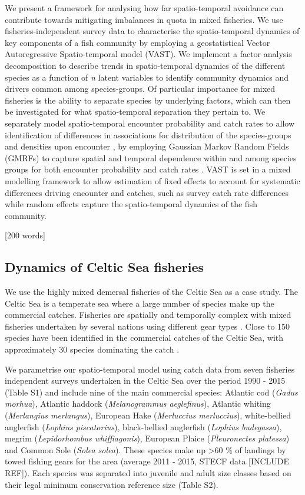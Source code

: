 \documentclass{nature}
\begin{document}
\begin{linenumbers}
We present a framework for analysing how far spatio-temporal avoidance can
contribute towards mitigating imbalances in quota in mixed fisheries. We use
fisheries-independent survey data to characterise the spatio-temporal dynamics
of key components of a fish community by employing a geostatistical Vector
Autoregressive Spatio-temporal model (VAST). We implement a factor analysis
decomposition to describe trends in spatio-temporal dynamics of the different
species as a function of \textit{n} latent variables \cite{Thorson2015} to
identify community dynamics and drivers common among species-groups. Of
particular importance for mixed fisheries is the ability to separate species by
underlying factors, which can then be investigated for what spatio-temporal
separation they pertain to. We separately model spatio-temporal encounter
probability and catch rates to allow identification of differences in
associations for distribution of the species-groups and densities upon
encounter \cite{Thorson2015a}, by employing Gaussian Markov Random Fields
(GMRFs) to capture spatial and temporal dependence within and among species
groups for both encounter probability and catch rates \cite{Thorson2013}. VAST
is set in a mixed modelling framework to allow estimation of fixed effects to
account for systematic differences driving encounter and catches, such as
survey catch rate differences while random effects capture the spatio-temporal
dynamics of the fish community.

[200 words]

\subsection{Dynamics of Celtic Sea fisheries}

We use the highly mixed demersal fisheries of the Celtic Sea as a case study.
The Celtic Sea is a temperate sea where a large number of species make up the
commercial catches.  Fisheries are spatially and temporally complex with mixed
fisheries undertaken by several nations using different gear types
\cite{Ellis2000, Gerritsen2012}. Close to 150 species have been identified in
the commercial catches of the Celtic Sea, with approximately 30 species
dominating the catch \cite{Mateo2016}.

We parametrise our spatio-temporal model using catch data from seven fisheries
independent surveys undertaken in the Celtic Sea over the period 1990 - 2015
(Table S1) and include nine of the main commercial species: Atlantic cod
(\textit{Gadus morhua}), Atlantic haddock (\textit{Melanogrammus aeglefinus}),
Atlantic whiting (\textit{Merlangius merlangus}), European Hake
(\textit{Merluccius merluccius}), white-bellied anglerfish (\textit{Lophius
	piscatorius}), black-bellied anglerfish (\textit{Lophius budegassa}),
megrim (\textit{Lepidorhombus whiffiagonis}), European Plaice
(\textit{Pleuronectes platessa}) and Common Sole (\textit{Solea solea}). These
species make up \textgreater 60 \% of landings by towed fishing gears for the
area (average 2011 - 2015, STECF data [INCLUDE REF]). Each species was
separated into juvenile and adult size classes based on their legal minimum
conservation reference size (Table S2).


\end{linenumbers}
\end{document}

